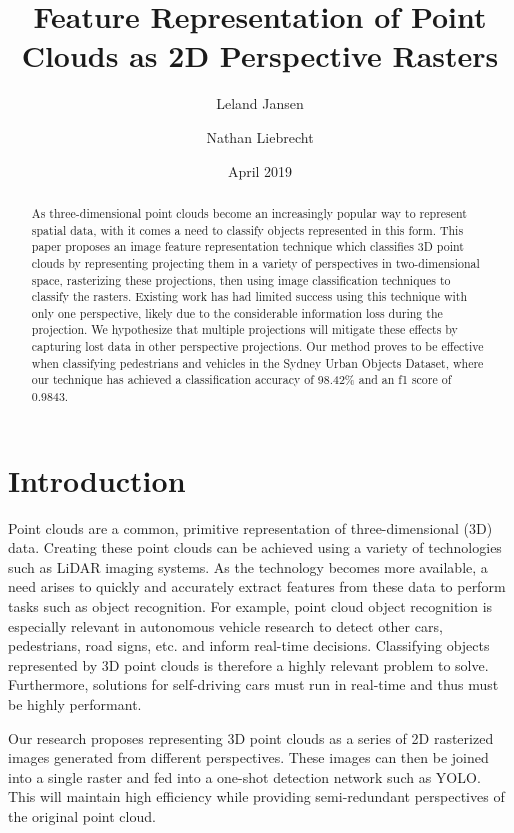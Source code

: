 \documentclass[runningheads,a4paper]{llncs}
\begin{document}
\title{Feature Representation of Point Clouds as 2D Perspective Rasters}
\author{Leland Jansen \and Nathan Liebrecht}
\date{April 2019}

\maketitle

\begin{abstract}
As three-dimensional point clouds become an increasingly popular way to
represent spatial data, with it comes a need to classify objects represented in
this form. This paper proposes an image feature representation technique which
classifies 3D point clouds by representing projecting them in a variety of
perspectives in two-dimensional space, rasterizing these projections, then using
image classification techniques to classify the rasters. Existing work has had
limited success using this technique with only one perspective, likely due to
the considerable information loss during the projection. We hypothesize that
multiple projections will mitigate these effects by capturing lost data in other
perspective projections. Our method proves to be effective when
classifying pedestrians and vehicles in the Sydney Urban Objects Dataset, where
our technique has achieved a classification accuracy of 98.42\% and an f1 score of 0.9843.
\end{abstract}

\section{Introduction}
Point clouds are a common, primitive representation of three-dimensional (3D)
data. Creating these point clouds can be achieved using a variety of
technologies such as LiDAR imaging systems. As the technology becomes more
available, a need arises to quickly and accurately extract features from these
data to perform tasks such as object recognition. For example, point cloud
object recognition is especially relevant in autonomous vehicle research to
detect other cars, pedestrians, road signs, etc. and inform real-time decisions.
Classifying objects represented by 3D point clouds is therefore a highly
relevant problem to solve. Furthermore, solutions for self-driving cars must run
in real-time and thus must be highly performant.

Our research proposes representing 3D point clouds as a series of 2D rasterized
images generated from different perspectives. These images can then be joined
into a single raster and fed into a one-shot detection network such as YOLO.
This will maintain high efficiency while providing semi-redundant perspectives
of the original point cloud.
\end{document}
